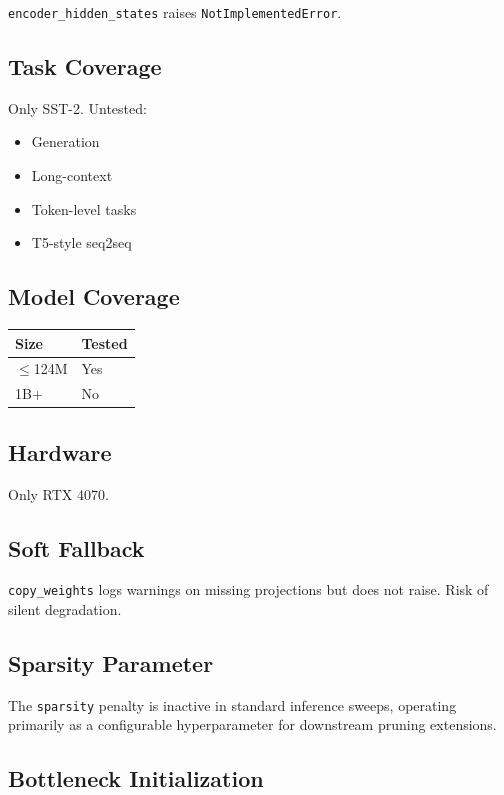 \texttt{encoder\_hidden\_states} raises \texttt{NotImplementedError}.

\subsection{Task Coverage}

Only SST-2. Untested:
\begin{itemize}
\item Generation
\item Long-context
\item Token-level tasks
\item T5-style seq2seq

\end{itemize}
\subsection{Model Coverage}

\begin{table}[H]
\centering
\small
\begin{tabular}{ll}
\toprule
\textbf{Size} & \textbf{Tested} \\
\midrule
$\le$124M & Yes \\
1B+ & No \\
\bottomrule
\end{tabular}
\end{table}

\subsection{Hardware}

Only RTX 4070.

\subsection{Soft Fallback}

\texttt{copy\_weights} logs warnings on missing projections but does not raise. 
Risk of silent degradation.

\subsection{Sparsity Parameter}

The \texttt{sparsity} penalty is inactive in standard inference sweeps, operating primarily as a configurable hyperparameter for downstream pruning extensions.

\subsection{Bottleneck Initialization}

